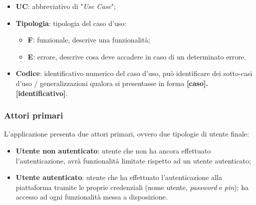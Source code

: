 \begin{itemize}
    \item \textbf{UC}: abbreviativo di "\textit{Use Case}";
    \item \textbf{Tipologia}: tipologia del caso d'uso:
        \begin{itemize}
            \item \textbf{F}: funzionale, descrive una funzionalità;
            \item \textbf{E}: errore, descrive cosa deve accadere in caso di un determinato errore.
        \end{itemize}
    \item \textbf{Codice}: identificativo numerico del caso d’uso, può identificare dei sotto-casi d’uso / generalizzazioni qualora si presentasse in forma \textbf{[caso].[identificativo]}.
\end{itemize}

\subsubsection*{Attori primari}
L’applicazione presenta due attori primari, ovvero due tipologie di utente finale:
\begin{itemize}
    \item \textbf{Utente non autenticato}: utente che non ha ancora effettuato l’autenticazione, avrà funzionalità limitate rispetto ad un utente autenticato;
    \item \textbf{Utente autenticato}: utente che ha effettuato l’autenticazione alla piattaforma tramite le proprie credenziali (nome utente, \textit{password} e \textit{pin}); ha accesso ad ogni funzionalità messa a disposizione.
\end{itemize}

\label{subsubsec:casi-d'uso}
